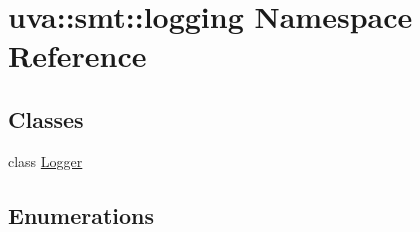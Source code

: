 \hypertarget{namespaceuva_1_1smt_1_1logging}{}\section{uva\+:\+:smt\+:\+:logging Namespace Reference}
\label{namespaceuva_1_1smt_1_1logging}
\subsection*{Classes}
\begin{DoxyCompactItemize}
\item 
class \hyperlink{classuva_1_1smt_1_1logging_1_1_logger}{Logger}
\end{DoxyCompactItemize}
\subsection*{Enumerations}
